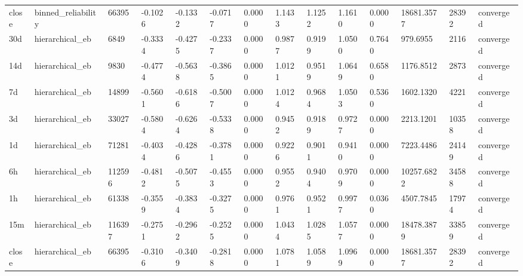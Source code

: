 \begin{tabular}{llllllllllllll}
close & binned\_reliability & 66395 & -0.1026 & -0.1332 & -0.0717 & 0.0000 & 1.1433 & 1.1252 & 1.1610 & 0.0000 & 18681.3577 & 28392 & converged \\
30d & hierarchical\_eb & 6849 & -0.3334 & -0.4275 & -0.2337 & 0.0000 & 0.9877 & 0.9199 & 1.0500 & 0.7640 & 979.6955 & 2116 & converged \\
14d & hierarchical\_eb & 9830 & -0.4774 & -0.5638 & -0.3865 & 0.0000 & 1.0121 & 0.9519 & 1.0649 & 0.6580 & 1176.8512 & 2873 & converged \\
7d & hierarchical\_eb & 14899 & -0.5601 & -0.6186 & -0.5007 & 0.0000 & 1.0124 & 0.9684 & 1.0503 & 0.5360 & 1602.1320 & 4221 & converged \\
3d & hierarchical\_eb & 33027 & -0.5804 & -0.6264 & -0.5338 & 0.0000 & 0.9452 & 0.9189 & 0.9727 & 0.0000 & 2213.1201 & 10358 & converged \\
1d & hierarchical\_eb & 71281 & -0.4034 & -0.4286 & -0.3781 & 0.0000 & 0.9226 & 0.9011 & 0.9410 & 0.0000 & 7223.4486 & 24149 & converged \\
6h & hierarchical\_eb & 112596 & -0.4812 & -0.5075 & -0.4553 & 0.0000 & 0.9552 & 0.9404 & 0.9709 & 0.0000 & 10257.6822 & 34588 & converged \\
1h & hierarchical\_eb & 61338 & -0.3559 & -0.3834 & -0.3275 & 0.0000 & 0.9761 & 0.9521 & 0.9977 & 0.0360 & 4507.7845 & 17974 & converged \\
15m & hierarchical\_eb & 116397 & -0.2751 & -0.2962 & -0.2525 & 0.0000 & 1.0434 & 1.0285 & 1.0577 & 0.0000 & 18478.3879 & 33859 & converged \\
close & hierarchical\_eb & 66395 & -0.3106 & -0.3409 & -0.2818 & 0.0000 & 1.0781 & 1.0589 & 1.0969 & 0.0000 & 18681.3577 & 28392 & converged \\
\bottomrule
\end{tabular}
